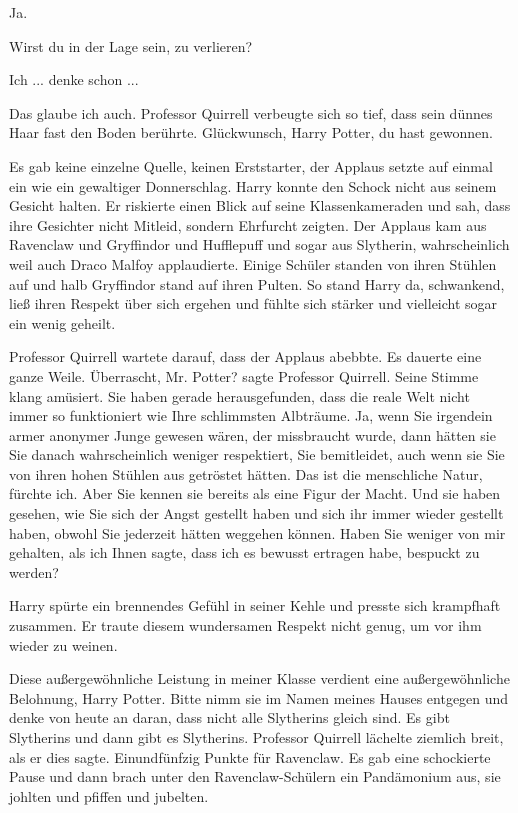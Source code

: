 \glqq Ja.\grqq{}

\glqq Wirst du in der Lage sein, zu verlieren?\grqq{}

\glqq Ich ... denke schon ...\grqq{}

\glqq Das glaube ich auch.\grqq{} Professor Quirrell verbeugte sich so tief,
dass sein dünnes Haar fast den Boden berührte. \glqq Glückwunsch, Harry Potter,
du hast gewonnen.\grqq{}

Es gab keine einzelne Quelle, keinen Erststarter, der Applaus setzte auf einmal
ein wie ein gewaltiger Donnerschlag. Harry konnte den Schock nicht aus seinem
Gesicht halten. Er riskierte einen Blick auf seine Klassenkameraden und sah,
dass ihre Gesichter nicht Mitleid, sondern Ehrfurcht zeigten. Der Applaus kam
aus Ravenclaw und Gryffindor und Hufflepuff und sogar aus Slytherin,
wahrscheinlich weil auch Draco Malfoy applaudierte. Einige Schüler standen von
ihren Stühlen auf und halb Gryffindor stand auf ihren Pulten. So stand Harry da,
schwankend, ließ ihren Respekt über sich ergehen und fühlte sich stärker und
vielleicht sogar ein wenig geheilt.

Professor Quirrell wartete darauf, dass der Applaus abebbte. Es dauerte eine
ganze Weile. \glqq Überrascht, Mr. Potter?\grqq{} sagte Professor Quirrell.
Seine Stimme klang amüsiert. \glqq Sie haben gerade herausgefunden, dass die
reale Welt nicht immer so funktioniert wie Ihre schlimmsten Albträume. Ja, wenn
Sie irgendein armer anonymer Junge gewesen wären, der missbraucht wurde, dann
hätten sie Sie danach wahrscheinlich weniger respektiert, Sie bemitleidet, auch
wenn sie Sie von ihren hohen Stühlen aus getröstet hätten. Das ist die
menschliche Natur, fürchte ich. Aber Sie kennen sie bereits als eine Figur der
Macht. Und sie haben gesehen, wie Sie sich der Angst gestellt haben und sich ihr
immer wieder gestellt haben, obwohl Sie jederzeit hätten weggehen können. Haben
Sie weniger von mir gehalten, als ich Ihnen sagte, dass ich es bewusst ertragen
habe, bespuckt zu werden?\grqq{}

Harry spürte ein brennendes Gefühl in seiner Kehle und presste sich krampfhaft
zusammen. Er traute diesem wundersamen Respekt nicht genug, um vor ihm wieder zu
weinen.

\glqq Diese außergewöhnliche Leistung in meiner Klasse verdient eine
außergewöhnliche Belohnung, Harry Potter. Bitte nimm sie im Namen meines Hauses
entgegen und denke von heute an daran, dass nicht alle Slytherins gleich sind.
Es gibt Slytherins und dann gibt es Slytherins.\grqq{} Professor Quirrell
lächelte ziemlich breit, als er dies sagte. \glqq Einundfünfzig Punkte für
Ravenclaw.\grqq{} Es gab eine schockierte Pause und dann brach unter den
Ravenclaw-Schülern ein Pandämonium aus, sie johlten und pfiffen und jubelten.

